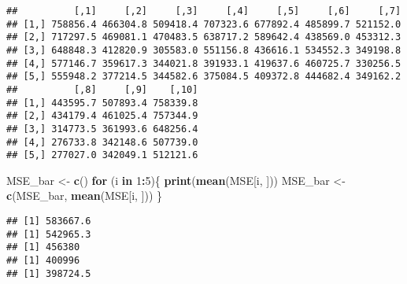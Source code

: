 \documentclass[]{article}
\newenvironment{Shaded}{\begin{snugshade}}{\end{snugshade}}
\newcommand{\KeywordTok}[1]{\textcolor[rgb]{0.13,0.29,0.53}{\textbf{#1}}}
\newcommand{\DataTypeTok}[1]{\textcolor[rgb]{0.13,0.29,0.53}{#1}}
\newcommand{\DecValTok}[1]{\textcolor[rgb]{0.00,0.00,0.81}{#1}}
\newcommand{\StringTok}[1]{\textcolor[rgb]{0.31,0.60,0.02}{#1}}
\newcommand{\ControlFlowTok}[1]{\textcolor[rgb]{0.13,0.29,0.53}{\textbf{#1}}}
\newcommand{\OperatorTok}[1]{\textcolor[rgb]{0.81,0.36,0.00}{\textbf{#1}}}
\newcommand{\NormalTok}[1]{#1}
\begin{document}
\begin{verbatim}
##          [,1]     [,2]     [,3]     [,4]     [,5]     [,6]     [,7]
## [1,] 758856.4 466304.8 509418.4 707323.6 677892.4 485899.7 521152.0
## [2,] 717297.5 469081.1 470483.5 638717.2 589642.4 438569.0 453312.3
## [3,] 648848.3 412820.9 305583.0 551156.8 436616.1 534552.3 349198.8
## [4,] 577146.7 359617.3 344021.8 391933.1 419637.6 460725.7 330256.5
## [5,] 555948.2 377214.5 344582.6 375084.5 409372.8 444682.4 349162.2
##          [,8]     [,9]    [,10]
## [1,] 443595.7 507893.4 758339.8
## [2,] 434179.4 461025.4 757344.9
## [3,] 314773.5 361993.6 648256.4
## [4,] 276733.8 342148.6 507739.0
## [5,] 277027.0 342049.1 512121.6
\end{verbatim}

\begin{Shaded}
\begin{Highlighting}[]
\NormalTok{MSE_bar <-}\StringTok{ }\KeywordTok{c}\NormalTok{()}
\ControlFlowTok{for}\NormalTok{ (i }\ControlFlowTok{in} \DecValTok{1}\OperatorTok{:}\DecValTok{5}\NormalTok{)\{}
  \KeywordTok{print}\NormalTok{(}\KeywordTok{mean}\NormalTok{(MSE[i, ]))}
\NormalTok{  MSE_bar <-}\StringTok{ }\KeywordTok{c}\NormalTok{(MSE_bar, }\KeywordTok{mean}\NormalTok{(MSE[i, ]))}
\NormalTok{\}}
\end{Highlighting}
\end{Shaded}

\begin{verbatim}
## [1] 583667.6
## [1] 542965.3
## [1] 456380
## [1] 400996
## [1] 398724.5
\end{verbatim}

\begin{Shaded}
\end{Shaded}
\end{document}
